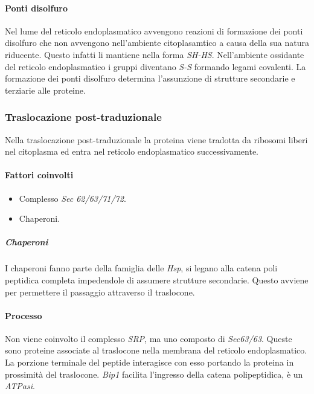 			\paragraph{Ponti disolfuro}
			Nel lume del reticolo endoplasmatico avvengono reazioni di formazione dei ponti disolfuro che non avvengono nell'ambiente citoplasamtico a causa della sua natura riducente.
			Questo infatti li mantiene nella forma \emph{SH-HS}.
			Nell'ambiente ossidante del reticolo endoplasmatico i gruppi diventano \emph{S-S} formando legami covalenti.
			La formazione dei ponti disolfuro determina l'assunzione di strutture secondarie e terziarie alle proteine.

		\subsubsection{Traslocazione post-traduzionale}
		Nella traslocazione post-traduzionale la proteina viene tradotta da ribosomi liberi nel citoplasma ed entra nel reticolo endoplasmatico successivamente.
		
			\paragraph{Fattori coinvolti}
			\begin{multicols}{2}
				\begin{itemize}
					\item Complesso \emph{Sec 62/63/71/72}.
					\item Chaperoni.
				\end{itemize}
			\end{multicols}

				\subparagraph{Chaperoni}
				I chaperoni fanno parte della famiglia delle \emph{Hsp}, si legano alla catena poli peptidica completa impedendole di assumere strutture secondarie.
				Questo avviene per permettere il passaggio attraverso il traslocone.

			\paragraph{Processo}
			Non viene coinvolto il complesso \emph{SRP}, ma uno composto di \emph{Sec63/63}.
			Queste sono proteine associate al traslocone nella membrana del reticolo endoplasmatico.
			La porzione terminale del peptide interagisce con esso portando la proteina in prossimit\`a del traslocone.
			\emph{Bip1} facilita l'ingresso della catena polipeptidica, \`e un \emph{ATPasi}.

